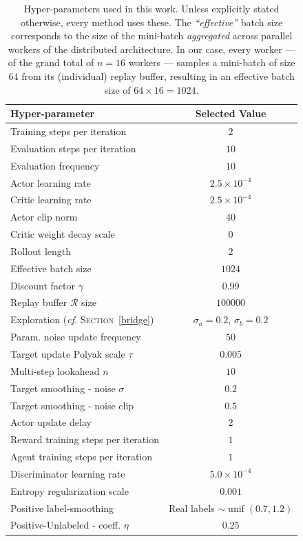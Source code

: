 \begin{table}[H]
\centering
\begin{tabular}{l|c}
\hline
Hyper-parameter&Selected Value \\
\hline\hline
\rowcolor{MyLightGray} Training steps per iteration&$2$ \\
Evaluation steps per iteration&$10$ \\
\rowcolor{MyLightGray} Evaluation frequency&$10$ \\
\hline
Actor learning rate&$2.5 \times 10^{-4}$ \\
\rowcolor{MyLightGray} Critic learning rate&$2.5 \times 10^{-4}$ \\
Actor clip norm&$40$ \\
\rowcolor{MyLightGray} Critic weight decay scale&$0$ \\
\hline
Rollout length&$2$ \\
\rowcolor{MyLightGray} Effective batch size&$1024$ \\
Discount factor $\gamma$&0.99 \\
\rowcolor{MyLightGray} Replay buffer $\mathcal{R}$ size&$100000$ \\
Exploration (\textit{cf.} \textsc{Section}~\ref{bridge})& $\sigma_a=0.2$, $\sigma_b=0.2$ \\
\rowcolor{MyLightGray} Param. noise update frequency&$50$ \\
Target update Polyak scale $\tau$&$0.005$ \\
\rowcolor{MyLightGray} Multi-step lookahead $n$&$10$ \\
\hline
Target smoothing - noise $\sigma$ \cite{Fujimoto2018-pe}&$0.2$ \\
\rowcolor{MyLightGray} Target smoothing - noise clip \cite{Fujimoto2018-pe}&$0.5$ \\
Actor update delay \cite{Fujimoto2018-pe}&$2$ \\
\hline
\rowcolor{MyLightGray} Reward training steps per iteration&$1$ \\
Agent training steps per iteration&$1$ \\
\rowcolor{MyLightGray} Discriminator learning rate&$5.0 \times 10^{-4}$ \\
Entropy regularization scale&$0.001$ \\
\rowcolor{MyLightGray} Positive label-smoothing&Real labels $\sim \operatorname{unif}(0.7,1.2)$ \\
\hline
Positive-Unlabeled \cite{Xu2019-uo} - coeff. $\eta$&$0.25$ \\
\hline
\end{tabular}
\caption{Hyper-parameters used in this work.
Unless explicitly stated otherwise, every method uses these.
The \emph{``effective''} batch size corresponds to the size of the mini-batch
\emph{aggregated} across parallel workers of the distributed architecture.
In our case, every worker --- of the grand total of $n=16$ workers ---
samples a mini-batch of size $64$ from its (individual) replay buffer,
resulting in an effective batch size of $64 \times 16 = 1024$.}
\label{hptable}
\end{table}

